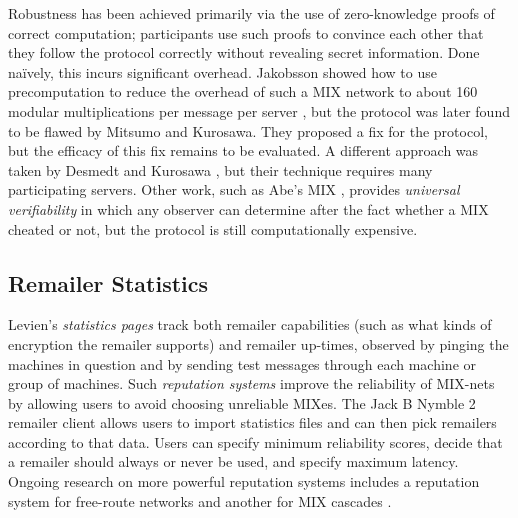 \documentclass{llncs}
\begin{document}
Robustness has been achieved primarily via the use of zero-knowledge
proofs of correct computation; participants use such proofs to convince
each other that they follow the protocol correctly without revealing secret
information. Done na\"{\a i}vely, this incurs significant
overhead. 
Jakobsson showed how to use precomputation to reduce the overhead of
such a MIX network to about 160 modular multiplications
per message per server \cite{flash-mix}, but the protocol was later
found to be flawed \cite{mitkuro} by Mitsumo and Kurosawa. They
proposed a fix for the protocol, but the efficacy of this fix remains
to be evaluated.  A different approach was taken by Desmedt and
Kurosawa \cite{desmedt}, but their technique requires many
participating servers. Other work, such as Abe's MIX \cite{abe},
provides \emph{universal verifiability} in which any observer can
determine after the fact whether a MIX cheated or not, but
the protocol is still computationally expensive.

\subsection{Remailer Statistics}

Levien's \emph{statistics pages} \cite{levien} track both remailer
capabilities (such as what kinds of encryption the remailer supports)
and remailer up-times, observed by pinging the machines in question
and by sending test messages through each machine or group of machines.
Such \emph{reputation systems} improve the reliability of MIX-nets by
allowing users to avoid choosing unreliable MIXes. The Jack B Nymble 2
remailer client \cite{potato} allows users to import statistics files
and can then pick remailers according to that data. Users can specify
minimum reliability scores, decide that a remailer should always or never
be used, and specify maximum latency. Ongoing research on more powerful
reputation systems includes a reputation system for free-route networks
\cite{mix-acc} and another for MIX cascades \cite{casc-rep}.




\end{document}
